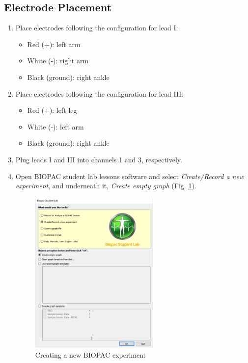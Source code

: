 \documentclass{article}
\begin{document}
\subsection*{Electrode Placement}
\begin{enumerate}
	\item Place electrodes following the configuration for lead I:\begin{itemize}
		\item Red (+): left arm
		\item White (-): right arm
		\item Black (ground): right ankle
	\end{itemize}
	
	\item Place electrodes following the configuration for lead III:\begin{itemize}
		\item Red (+): left leg
		\item White (-): left arm
		\item Black (ground): right ankle
	\end{itemize}
	
	\item Plug leads I and III into channels 1 and 3, respectively.
	\item Open BIOPAC student lab lessons software and select \textit{Create/Record a new experiment}, and underneath it, \textit{Create empty graph} (Fig. \ref{menu}).
		\begin{figure}[h]
	\centering\includegraphics[width=0.6\textwidth]{../images/ECG_II_9.png}
		\caption{Creating a new BIOPAC experiment}
		\label{menu}
		\end{figure}


\end{enumerate}
\end{document}
